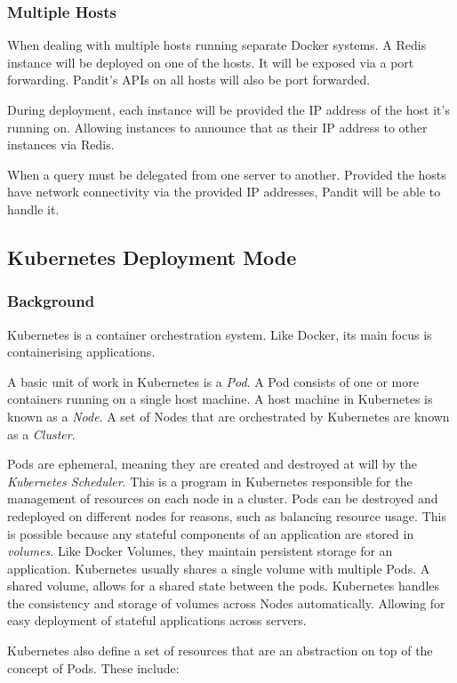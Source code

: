\documentclass[a4paper,12pt]{report}
\begin{document}
\subsubsection{Multiple Hosts}
When dealing with multiple hosts running separate Docker systems. A Redis instance will be deployed on one of the hosts. It will be exposed via a port forwarding. Pandit's APIs on all hosts will also be port forwarded. 

During deployment, each instance will be provided the IP address of the host it's running on. Allowing instances to announce that as their IP address to other instances via Redis.

When a query must be delegated from one server to another. Provided the hosts have network connectivity via the provided IP addresses, Pandit will be able to handle it.

\subsection{Kubernetes Deployment Mode}
\subsubsection{Background}
Kubernetes is a container orchestration system. Like Docker, its main focus is containerising applications.

A basic unit of work in Kubernetes is a \textit{Pod}. A Pod consists of one or more containers running on a single host machine. A host machine in Kubernetes is known as a \textit{Node}. A set of Nodes that are orchestrated by Kubernetes are known as a \textit{Cluster}.

Pods are ephemeral, meaning they are created and destroyed at will by the \textit{Kubernetes Scheduler}. This is a program in Kubernetes responsible for the management of resources on each node in a cluster. Pods can be destroyed and redeployed on different nodes for reasons, such as balancing resource usage. This is possible because any stateful components of an application are stored in \textit{volumes}. Like Docker Volumes, they maintain persistent storage for an application. Kubernetes usually shares a single volume with multiple Pods. A shared volume, allows for a shared state between the pods. Kubernetes handles the consistency and storage of volumes across Nodes automatically. Allowing for easy deployment of stateful applications across servers.

Kubernetes also define a set of resources that are an abstraction on top of the concept of Pods.
These include:
\end{document}
